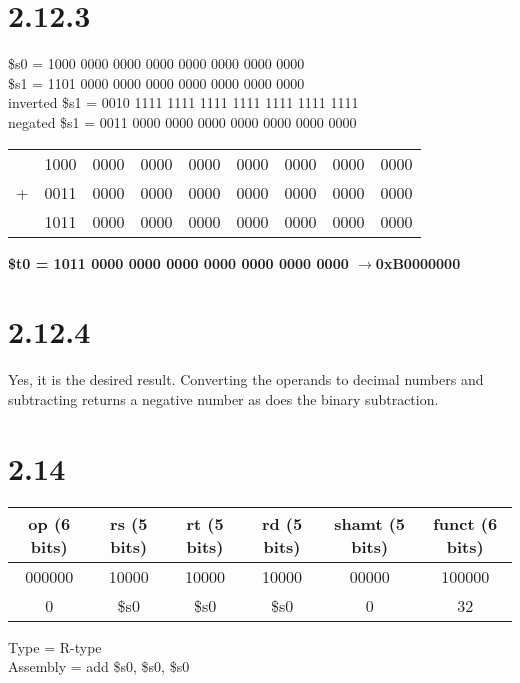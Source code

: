 \documentclass[12pt]{article}
\begin{document}
\section*{2.12.3}
\$s0 = 1000 0000 0000 0000 0000 0000 0000 0000\\
\$s1 = 1101 0000 0000 0000 0000 0000 0000 0000\\
inverted \$s1 = 0010 1111 1111 1111 1111 1111 1111 1111\\
negated \$s1 = 0011 0000 0000 0000 0000 0000 0000 0000\\
\newline
\begin{tabular}{ccccccccc}
	& 1000 & 0000 & 0000 & 0000 & 0000 & 0000 & 0000 & 0000\\
	+ & 0011 & 0000 & 0000 & 0000 & 0000 & 0000 & 0000 & 0000\\
	\hline
	& 1011 & 0000 & 0000 & 0000 & 0000 & 0000 & 0000 & 0000\\
\end{tabular}
\newline
\newline
\textbf{\$t0 = 1011 0000 0000 0000 0000 0000 0000 0000 $\rightarrow$0xB0000000}
	
\section*{2.12.4}
Yes, it is the desired result.  Converting the operands to decimal numbers and subtracting returns a negative number as does the binary subtraction.

\section*{2.14}
\begin{tabular}{|c|c|c|c|c|c|}
	\hline
	op (6 bits) & rs (5 bits) & rt (5 bits) & rd (5 bits) & shamt (5 bits) & funct (6 bits)\\
	\hline
	000000 & 10000 & 10000 & 10000 & 00000 & 100000\\
	\hline
	0 & \$s0 & \$s0 & \$s0 & 0 & 32\\
	\hline
\end{tabular}
\newline
\newline
Type = R-type\\
Assembly = add \$s0, \$s0, \$s0
\end{document}
